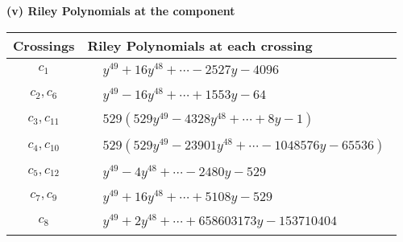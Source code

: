 \documentclass[1p]{elsarticle_modified}
\theoremstyle{definition}
\begin{document}
\flushleft \textbf{(v) Riley Polynomials at the component}\newline \\
\begin{tabular}{m{50pt}|m{274pt}}
Crossings & \hspace{64pt}Riley Polynomials at each crossing \\
\hline $$\begin{aligned}c_{1}\end{aligned}$$&$\begin{aligned}
&y^{49}+16 y^{48}+\cdots-2527 y-4096
\end{aligned}$\\
\hline $$\begin{aligned}c_{2},c_{6}\end{aligned}$$&$\begin{aligned}
&y^{49}-16 y^{48}+\cdots+1553 y-64
\end{aligned}$\\
\hline $$\begin{aligned}c_{3},c_{11}\end{aligned}$$&$\begin{aligned}
&529(529 y^{49}-4328 y^{48}+\cdots+8 y-1)
\end{aligned}$\\
\hline $$\begin{aligned}c_{4},c_{10}\end{aligned}$$&$\begin{aligned}
&529(529 y^{49}-23901 y^{48}+\cdots-1048576 y-65536)
\end{aligned}$\\
\hline $$\begin{aligned}c_{5},c_{12}\end{aligned}$$&$\begin{aligned}
&y^{49}-4 y^{48}+\cdots-2480 y-529
\end{aligned}$\\
\hline $$\begin{aligned}c_{7},c_{9}\end{aligned}$$&$\begin{aligned}
&y^{49}+16 y^{48}+\cdots+5108 y-529
\end{aligned}$\\
\hline $$\begin{aligned}c_{8}\end{aligned}$$&$\begin{aligned}
&y^{49}+2 y^{48}+\cdots+658603173 y-153710404
\end{aligned}$\\
\hline
\end{tabular}\\~\\
\end{document}
